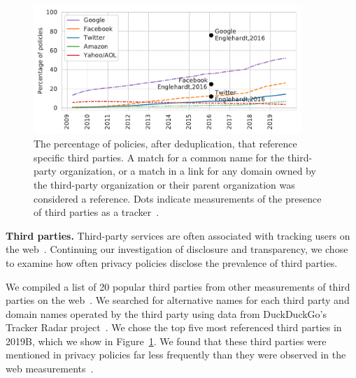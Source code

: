 \begin{figure}
    \centering
    \includegraphics[width=0.9\textwidth]{chapters/privacypolicies/figures/trackers.pdf}
    \caption{The percentage of policies, after deduplication, that reference specific third parties. A match for a common name for the third-party organization, or a match in a link for any domain owned by the third-party organization or their parent organization was considered a reference. Dots indicate measurements of the presence of third parties as a tracker~\cite{englehardt2016online}.}
    \label{fig:trackers}
\end{figure}

\textbf{Third parties.} Third-party services are often associated with tracking users on the web~\cite{englehardt2016online}. Continuing our investigation of disclosure and transparency, we chose to examine how often privacy policies disclose the prevalence of third parties.

We compiled a list of 20 popular third parties from other measurements of third parties on the web~\cite{trackerradar, englehardt2016online,lerner2016internet}. We searched for alternative names for each third party and domain names operated by the third party using data from DuckDuckGo's Tracker Radar project~\cite{trackerradar}. We chose the top five most referenced third parties in 2019B, which we show in Figure~\ref{fig:trackers}. We found that these third parties were mentioned in privacy policies far less frequently than they were observed in the web measurements~\cite{trackerradar,englehardt2016online}. 

